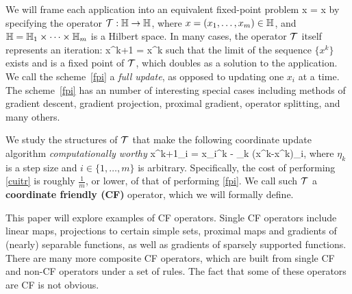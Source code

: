 We will frame each application into an equivalent fixed-point problem
\beq\label{fpprob}
x = \cT x
\eeq
by specifying the operator  ${\mathcal{T}}:\mathbb{H} \to \mathbb{H}$, where $x=(x_1,\ldots,x_m)\in \mathbb{H}$, and $\mathbb{H}=\mathbb{H}_1\times \cdots \times \mathbb{H}_m$ is a Hilbert space. 
In many cases, the operator ${\mathcal{T}}$ itself represents an iteration:
\beq\label{fpi}
x^{k+1} = \cT x^k
\eeq
such that the limit of the sequence $\{x^k\}$  exists and is a fixed point of ${\mathcal{T}}$, which {\color{red}doubles} as a solution to the application. We call the scheme~\eqref{fpi} a \emph{full update}, as opposed to updating one $x_i$ at a time. The  scheme~\eqref{fpi} has an number of interesting special cases including  methods of gradient descent, gradient projection, proximal gradient,  operator splitting, and many others.

We study the structures of ${\mathcal{T}}$ that make the  following coordinate update algorithm \emph{computationally worthy}
\beq\label{cuitr}
x^{k+1}_i = x_i^k - \eta_k (x^k-\cT x^k)_i,
\eeq
where  $\eta_k$ is a  step size and $i\in\{1,\ldots,m\}$ is arbitrary. Specifically, the cost of performing  \eqref{cuitr}  is roughly $\frac{1}{m}$, or lower, of that of performing \eqref{fpi}. We call such ${\mathcal{T}}$ a \textbf{coordinate friendly (CF)} operator, which we will formally define.

This paper will explore examples of CF operators. Single CF operators include linear maps, projections to certain simple sets, proximal maps and gradients of (nearly) separable functions, as well as gradients of sparsely supported functions. There are many more composite CF operators, which are built from single CF and non-CF operators under a set of rules.  The fact that some of these operators are CF is not obvious.  

